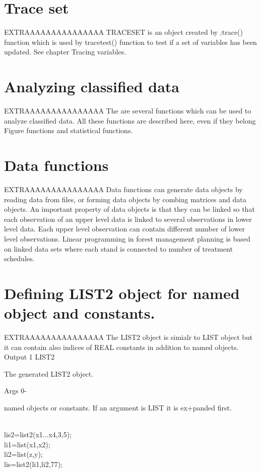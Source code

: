 \section*{Trace set}
EXTRAAAAAAAAAAAAAAA
TRACESET is an object created by ;trace() function which is used by
\textcolor{VioletRed}{tracetest}() function to test if a set of variables has been updated. See
chapter Tracing variables.
\section*{Analyzing classified data}
EXTRAAAAAAAAAAAAAAA
The are several functions which can be used to analyze classified data.
All these functions are described here, even if they belong Figure functions and
statistical functions.
\section*{Data functions}
EXTRAAAAAAAAAAAAAAA
Data functions can generate data objects by reading data from files, or forming data
objects by combing matrices and data objects. An important property of data objects
is that they can be linked so that each observation of an upper level data
is linked to several observations in lower level data. Each upper level
observation can contain different number of lower level observations.
Linear programming in forest management planning is based on linked data sets where each
stand is connected to number of treatment schedules.
\section*{Defining LIST2 object for named object and constants.}
EXTRAAAAAAAAAAAAAAA
The LIST2 object is simialr to LIST object but it can contain also
indices of REAL constants in addition to named objects.
\vspace{0.3cm}
\hline
\vspace{0.3cm}
\noindent Output \tabto{3cm}  1 \tabto{5cm}   LIST2  \tabto{7cm}
\begin{changemargin}{3cm}{0cm}
\noindent The generated LIST2 object.
\end{changemargin}
\vspace{0.3cm}
\hline
\vspace{0.3cm}
\noindent Args \tabto{3cm}  0-  \tabto{5cm}     \tabto{7cm}
\begin{changemargin}{3cm}{0cm}
\noindent  named objects or constants. If an argument is LIST it is ex+panded
first.
\end {changemargin}
\hline
\vspace{0.2cm}
\begin{example}[list2ex]\\
\label{list2ex}
lis2=\textcolor{VioletRed}{list2}(x1...x4,3,5);\\
li1=\textcolor{VioletRed}{list}(x1,x2);\\
li2=\textcolor{VioletRed}{list}(z,y);\\
lis=\textcolor{VioletRed}{list2}(li1,li2,77);
\end{example}
